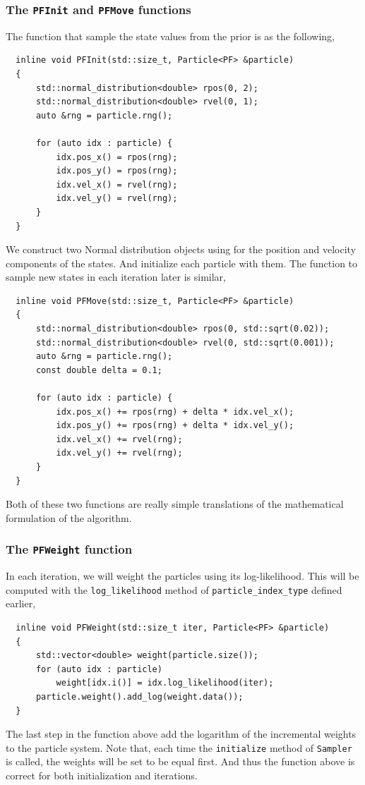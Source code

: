 \subsubsection{The \texttt{PFInit} and \texttt{PFMove} functions}

The function that sample the state values from the prior is as the following,
\begin{Verbatim}
  inline void PFInit(std::size_t, Particle<PF> &particle)
  {
      std::normal_distribution<double> rpos(0, 2);
      std::normal_distribution<double> rvel(0, 1);
      auto &rng = particle.rng();

      for (auto idx : particle) {
          idx.pos_x() = rpos(rng);
          idx.pos_y() = rpos(rng);
          idx.vel_x() = rvel(rng);
          idx.vel_y() = rvel(rng);
      }
  }
\end{Verbatim}
We construct two Normal distribution objects using for the position and
velocity components of the states. And initialize each particle with them. The
function to sample new states in each iteration later is similar,
\begin{Verbatim}
  inline void PFMove(std::size_t, Particle<PF> &particle)
  {
      std::normal_distribution<double> rpos(0, std::sqrt(0.02));
      std::normal_distribution<double> rvel(0, std::sqrt(0.001));
      auto &rng = particle.rng();
      const double delta = 0.1;

      for (auto idx : particle) {
          idx.pos_x() += rpos(rng) + delta * idx.vel_x();
          idx.pos_y() += rpos(rng) + delta * idx.vel_y();
          idx.vel_x() += rvel(rng);
          idx.vel_y() += rvel(rng);
      }
  }
\end{Verbatim}
Both of these two functions are really simple translations of the mathematical
formulation of the algorithm.

\subsubsection{The \texttt{PFWeight} function}

In each iteration, we will weight the particles using its log-likelihood. This
will be computed with the \verb|log_likelihood| method of
\verb|particle_index_type| defined earlier,
\begin{Verbatim}
  inline void PFWeight(std::size_t iter, Particle<PF> &particle)
  {
      std::vector<double> weight(particle.size());
      for (auto idx : particle)
          weight[idx.i()] = idx.log_likelihood(iter);
      particle.weight().add_log(weight.data());
  }
\end{Verbatim}
The last step in the function above add the logarithm of the incremental
weights to the particle system. Note that, each time the \verb|initialize|
method of \verb|Sampler| is called, the weights will be set to be equal first.
And thus the function above is correct for both initialization and iterations.

